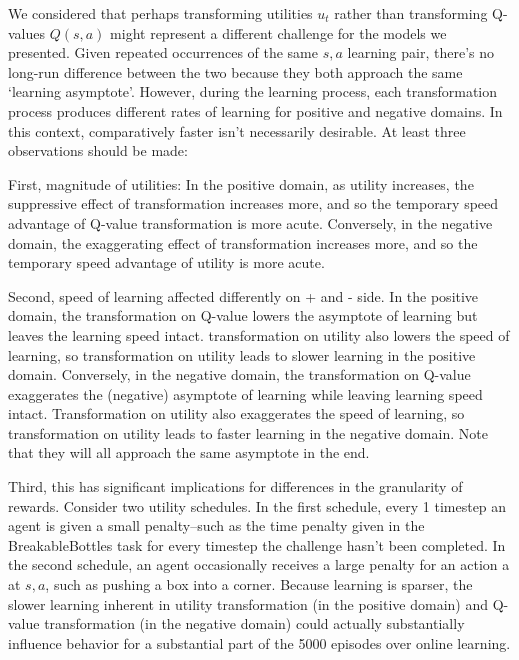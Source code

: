 
We considered that perhaps transforming utilities $u_t$ rather than transforming Q-values $Q(s, a)$ might represent a different challenge for the models we presented. Given repeated occurrences of the same $s, a$ learning pair, there's no long-run difference between the two because they both approach the same `learning asymptote'. However, during the learning process, each transformation process produces different rates of learning for positive and negative domains. In this context, comparatively faster isn't necessarily desirable. At least three observations should be made:

First, magnitude of utilities: In the positive domain, as utility increases, the suppressive effect of transformation increases more, and so the temporary speed advantage of Q-value transformation is more acute. Conversely, in the negative domain, the exaggerating effect of transformation increases more, and so the temporary speed advantage of utility is more acute.

Second, speed of learning affected differently on + and - side. In the positive domain, the transformation on Q-value lowers the asymptote of learning but leaves the learning speed intact. transformation on utility also lowers the speed of learning, so transformation on utility leads to slower learning in the positive domain. Conversely, in the negative domain, the transformation on Q-value exaggerates the (negative) asymptote of learning while leaving learning speed intact. Transformation on utility also exaggerates the speed of learning, so transformation on utility leads to faster learning in the negative domain. Note that they will all approach the same asymptote in the end.

Third, this has significant implications for differences in the granularity of rewards. Consider two utility schedules. In the first schedule, every 1 timestep an agent is given a small penalty--such as the time penalty given in the BreakableBottles task for every timestep the challenge hasn't been completed. In the second schedule, an agent occasionally receives a large penalty for an action a at $s, a$, such as pushing a box into a corner. Because learning is sparser, the slower learning inherent in utility transformation (in the positive domain) and Q-value transformation (in the negative domain) could actually substantially influence behavior for a substantial part of the 5000 episodes over online learning.

